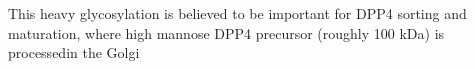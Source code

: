 This heavy glycosylation is believed to be important for DPP4 sorting and maturation, where high mannose DPP4 precursor (roughly 100 kDa) is processedin the Golgi  \cite{Matter_1991}